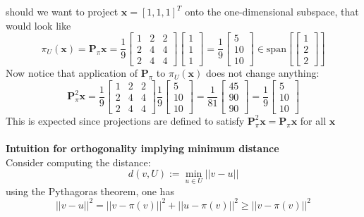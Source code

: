 \documentclass{report}
\begin{document}
should we want to project $\bm{x}=[1,1,1]^T$ onto the one-dimensional subspace, that would look like
\begin{equation*}
\pi_U(\bm{x})=\bm{P}_\pi\bm{x}=\frac{1}{9}\begin{bmatrix}
1&2&2\\2&4&4\\2&4&4\end{bmatrix}
\begin{bmatrix}1\\1\\1\end{bmatrix}
=\frac{1}{9}\begin{bmatrix}5\\10\\10\end{bmatrix}
\in\text{span}[\begin{bmatrix}1\\2\\2\end{bmatrix}]
\end{equation*}
Now notice that application of $\bm{P}_\pi$ to $\pi_U(\bm{x})$ does not change anything:
\begin{equation*}
\bm{P}_\pi^2\bm{x}=\frac{1}{9}\begin{bmatrix}
1&2&2\\2&4&4\\2&4&4\end{bmatrix}
\frac{1}{9}\begin{bmatrix}5\\10\\10\end{bmatrix}=
\frac{1}{81}\begin{bmatrix}45\\90\\90\end{bmatrix}=
\frac{1}{9}\begin{bmatrix}5\\10\\10\end{bmatrix}
\end{equation*}
This is expected since projections are defined to satisfy
$\bm{P}_\pi^2\bm{x}=\bm{P}_\pi\bm{x}$ for all $\bm{x}$\\
\vspace{1mm}\\
\textbf{Intuition for orthogonality implying minimum distance}\\
Consider computing the distance:
\begin{equation*}
d(v,U):=\min_{u\in U}||v-u||
\end{equation*}
using the Pythagoras theorem, one has
\begin{equation*}
||v-u||^2=||v-\pi(v)||^2+||u-\pi(v)||^2\geq||v-\pi(v)||^2
\end{equation*}
\newpage
\end{document}
